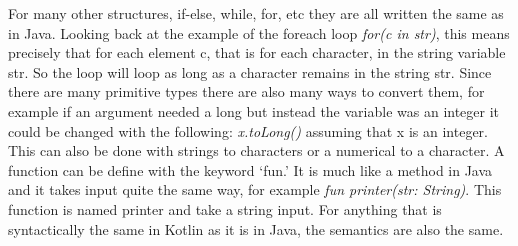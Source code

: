\hspace{1em}For many other structures, if-else, while, for, etc they are all written the same as in Java. Looking back at the example of the foreach loop \textit{for(c in str)}, this means precisely that for each element c, that is for each character, in the string variable str. So the loop will loop as long as a character remains in the string str. Since there are many primitive types there are also many ways to convert them, for example if an argument needed a long but instead the variable was an integer it could be changed with the following: \textit{x.toLong()} assuming that x is an integer. This can also be done with strings to characters or a numerical to a character. A function can be define with the keyword `fun.' It is much like a method in Java and it takes input quite the same way, for example \textit{fun printer(str: String)}. This function is named printer and take a string input. For anything that is syntactically the same in Kotlin as it is in Java, the semantics are also the same.